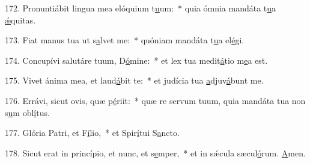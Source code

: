 172. Pronuntiábit lingua mea elóquium t\uline{u}um:~* quia ómnia mandáta t\uline{u}a \uline{ǽ}quitas.\par 
173. Fiat manus tua ut s\uline{a}lvet me:~* quóniam mandáta t\uline{u}a el\uline{é}gi.\par 
174. Concupívi salutáre tuum, D\uline{ó}mine:~* et lex tua medit\uline{á}tio m\uline{e}a est.\par 
175. Vivet ánima mea, et laud\uline{á}bit te:~* et judícia tua \uline{a}djuv\uline{á}bunt me.\par 
176. Errávi, sicut ovis, quæ p\uline{é}riit:~* quæ re servum tuum, quia mandáta tua non s\uline{u}m obl\uline{í}tus.\par 
177. Glória Patri, et F\uline{í}lio,~* et Spir\uline{í}tui S\uline{a}ncto.\par 
178. Sicut erat in princípio, et nunc, et s\uline{e}mper,~* et in sǽcula sæcul\uline{ó}rum. \uline{A}men.\par 
